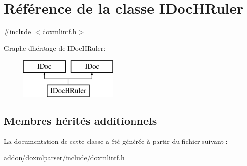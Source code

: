 \hypertarget{class_i_doc_h_ruler}{}\section{Référence de la classe I\+Doc\+H\+Ruler}
\label{class_i_doc_h_ruler}


{\ttfamily \#include $<$doxmlintf.\+h$>$}

Graphe d\textquotesingle{}héritage de I\+Doc\+H\+Ruler\+:\begin{figure}[H]
\begin{center}
\leavevmode
\includegraphics[height=2.000000cm]{class_i_doc_h_ruler}
\end{center}
\end{figure}
\subsection*{Membres hérités additionnels}


La documentation de cette classe a été générée à partir du fichier suivant \+:\begin{DoxyCompactItemize}
\item 
addon/doxmlparser/include/\hyperlink{include_2doxmlintf_8h}{doxmlintf.\+h}\end{DoxyCompactItemize}
